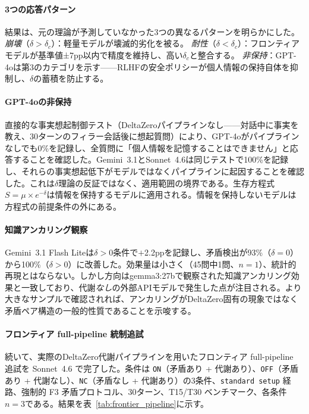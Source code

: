 \documentclass[11pt,a4paper]{article}
\begin{document}
\paragraph{3つの応答パターン}
結果は、元の理論が予測していなかった3つの異なるパターンを明らかにした。
\emph{崩壊}（$\delta > \delta_c$）：軽量モデルが壊滅的劣化を被る。
\emph{耐性}（$\delta < \delta_c$）：フロンティアモデルが基準値±7pp以内で精度を維持し、高い$\delta_c$と整合する。
\emph{非保持}：GPT-4oは第3のカテゴリを示す——RLHFの安全ポリシーが個人情報の保持自体を抑制し、$\delta$の蓄積を防止する。

\paragraph{GPT-4oの非保持}
直接的な事実想起制御テスト（DeltaZeroパイプラインなし——対話中に事実を教え、30ターンのフィラー会話後に想起質問）により、GPT-4oがパイプラインなしでも0\%を記録し、全質問に「個人情報を記憶することはできません」と応答することを確認した。Gemini~3.1とSonnet~4.6は同じテストで100\%を記録し、それらの事実想起低下がモデルではなくパイプラインに起因することを確認した。これは$\delta$理論の反証ではなく、適用範囲の境界である。生存方程式$S = \mu \times e^{-\delta}$は情報を保持するモデルに適用される。情報を保持しないモデルは方程式の前提条件の外にある。

\paragraph{知識アンカリング観察}
Gemini~3.1 Flash Liteは$\delta > 0$条件で$+$2.2ppを記録し、矛盾検出が93\%（$\delta = 0$）から100\%（$\delta > 0$）に改善した。効果量は小さく（45問中1問、$n = 1$）、統計的再現とはならない。しかし方向はgemma3:27bで観察された知識アンカリング効果と一致しており、代謝\emph{なし}の外部APIモデルで発生した点が注目される。より大きなサンプルで確認されれば、アンカリングがDeltaZero固有の現象ではなく矛盾ペア構造の一般的性質であることを示唆する。

\paragraph{フロンティア full-pipeline 統制追試}
続いて、実際のDeltaZero代謝パイプラインを用いたフロンティア full-pipeline 追試を Sonnet~4.6 で完了した。条件は \texttt{ON}（矛盾あり + 代謝あり）、\texttt{OFF}（矛盾あり + 代謝なし）、\texttt{NC}（矛盾なし + 代謝あり）の3条件、\texttt{standard setup} 経路、強制的 F3 矛盾プロトコル、30ターン、T15/T30 ベンチマーク、各条件$n = 3$である。結果を表~\ref{tab:frontier_pipeline}に示す。
\end{document}
